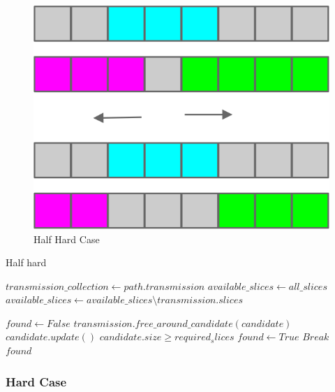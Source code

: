 \documentclass[11pt,a4paper]{article}
\begin{document}
\begin{figure}[H]
  \centering
    \includegraphics[scale=1]{halfhardcase.jpg}
  \caption{Half Hard Case}
  \label{fig:halfhardcase}
\end{figure}

\begin{algorithm}[H]
\caption{Half hard}\label{half_hard}
\begin{algorithmic}[1]
	\State $transmission\_collection\gets path.transmission$
	\State $available\_slices\gets all\_slices$
      \State $available\_slices \gets available\_slices\setminus transmission.slices$
	\EndFor
	
	\State $found \gets False$
			\State $transmission.free\_around\_candidate(candidate)$
		\EndFor
		\State $candidate.update()$
		\If $candidate.size \geq required_slices$
			\State $found \gets True$
			\State $Break$
		\EndIf
	\EndFor
	\State \Return $found$
\EndProcedure
\end{algorithmic}
\end{algorithm}

\subsubsection{Hard Case}
\end{document}
